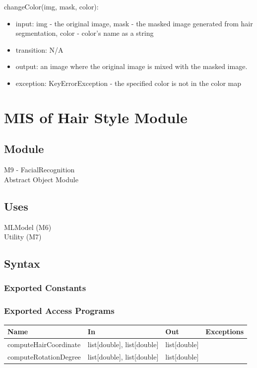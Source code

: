 \documentclass[12pt, titlepage]{article}
\begin{document}
 \noindent changeColor(img, mask, color):
\begin{itemize}
\item input: img - the original image, mask - the masked image generated from hair segmentation, color - color's name as a string
\item transition: N/A
\item output: an image where the original image is mixed with the masked image.
\item exception: KeyErrorException - the specified color is not in the color map
\end{itemize}

\newpage
\section{MIS of Hair Style Module}
\subsection{Module}
M9 - FacialRecognition\\
Abstract Object Module

\subsection{Uses}
MLModel (M6) \\
Utility (M7)

\subsection{Syntax}

\subsubsection{Exported Constants}
\subsubsection{Exported Access Programs}

\begin{center}
\begin{tabular}{p{4cm} p{3cm} p{4cm} p{4cm}}
\hline
\textbf{Name} & \textbf{In} & \textbf{Out} & \textbf{Exceptions} \\
\hline
computeHairCoordinate & list[double], list[double] & list[double] &  \\
computeRotationDegree & list[double], list[double] & list[double] &  \\
\hline
\end{tabular}
\end{center}
\end{document}
